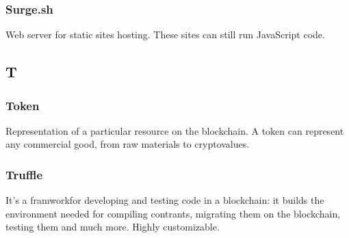 \subsubsection*{Surge.sh}
Web server for static sites hosting. These sites can still run JavaScript code.


\subsection*{T}

\subsubsection*{Token}
Representation of a particular resource on the blockchain\glo. A token can represent any commercial good, from raw materials to cryptovalues. 

\subsubsection*{Truffle}
It's a framwork\glosp for developing and testing code in a blockchain\glo: it builds the environment needed for compiling contrants, migrating them on the blockchain, testing them and much more. Highly customizable.






